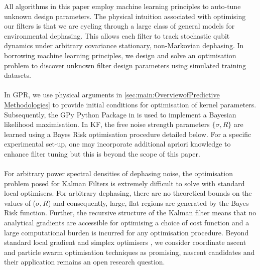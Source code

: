 All algorithms in this paper employ machine learning principles to auto-tune unknown design parameters. The physical intuition associated with optimising our filters is that we are cycling through a large class of general models for environmental dephasing. This allows each filter to track stochastic qubit dynamics under arbitrary covariance stationary, non-Markovian dephasing. In borrowing machine learning principles, we design and solve an optimisation problem to discover unknown filter design parameters using simulated training datasets. 
\\
\\
In GPR, we use physical arguments in \cref{sec:main:OverviewofPredictive Methodologies} to provide initial conditions for optimisation of kernel parameters. Subsequently, the GPy Python Package in \cite{gpy2014} is used to implement a Bayesian likelihood maximisation. In KF, the free noise strength parameters $\{ \sigma, R \}$ are learned using a Bayes Risk optimisation procedure detailed below. For a specific experimental set-up, one may incorporate additional apriori knowledge to enhance filter tuning but this is beyond the scope of this paper. 
\\
\\
For arbitrary power spectral densities of dephasing noise, the optimisation problem posed for Kalman Filters is extremely difficult to solve with standard local optimisers. For arbitrary dephasing, there are no theoretical bounds on the values of ($\sigma, R$) and consequently, large, flat regions are generated by the Bayes Risk function. Further, the recursive structure of the Kalman filter means that no analytical gradients are accessible for optimising a choice of cost function and a large computational burden is incurred for any optimisation procedure. Beyond standard local gradient and simplex optimisers \cite{mathews1993stochastic} , we consider coordinate ascent \cite{abbeel2005} and particle swarm optimisation techniques as promising, nascent candidates and their application remains an open research question. 
\\
\\
